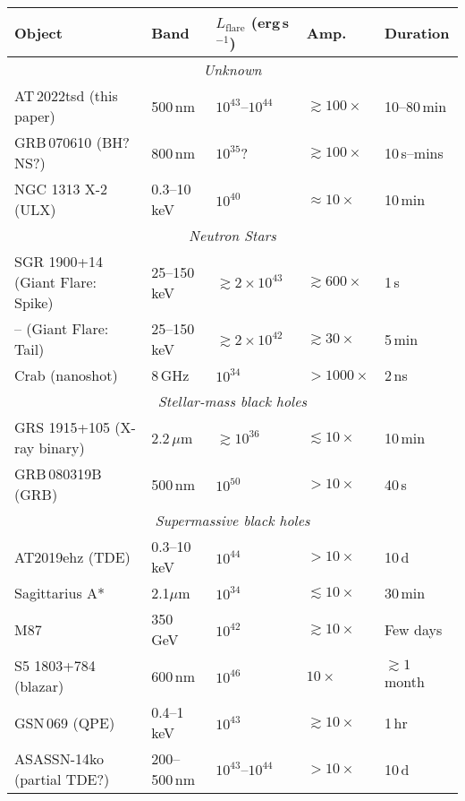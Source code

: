 \documentclass{nature_plusfigure}
\begin{document}
\begin{table}
    \centering
    \begin{tabular}{lllll}
    \hline\hline
     Object & Band & $L_\mathrm{flare}$ (erg\,s$^{-1}$) & Amp. & Duration \\
     \hline
     \multicolumn{5}{c}{\emph{Unknown}}\\
    AT\,2022tsd (this paper) & 500\,nm & $10^{43}$--$10^{44}$ & $\gtrsim100\times$ & 10--80\,min \\
    GRB\,070610 (BH?\cite{Kasliwal2008} NS?\cite{CastroTirado2008,Stefanescu2008}) & 800\,nm & $10^{35}$? & $\gtrsim100\times$ & 10\,s--mins \\
     NGC 1313 X-2 (ULX) & 0.3--10\,keV\cite{Mucciarelli2007} & $10^{40}$ & $\approx10\times$ & 10\,min \\
     \multicolumn{5}{c}{\emph{Neutron Stars}}\\
    SGR 1900+14\cite{Hurley1999} (Giant Flare: Spike) & 25--150\,keV & $\gtrsim2\times10^{43}$ & $\gtrsim600\times$ & 1\,s \\
    -- (Giant Flare: Tail) & 25--150\,keV & $\gtrsim2\times10^{42}$ & $\gtrsim30\times$ & 5\,min \\
    Crab (nanoshot) & 8\,GHz\cite{Hankins2003} & $10^{34}$ & $>1000\times$ & 2\,ns \\
     \multicolumn{5}{c}{\emph{Stellar-mass black holes}}\\
    GRS 1915+105 (X-ray binary) & 2.2\,$\mu$m\cite{Fender1997} & $\gtrsim10^{36}$ & $\lesssim 10\times$ & 10\,min \\
    GRB\,080319B  (GRB) & 500\,nm\cite{Racusin2008} & $10^{50}$ & $>10\times$ & 40\,s \\
     \multicolumn{5}{c}{\emph{Supermassive black holes}}\\
    AT2019ehz (TDE) & 0.3--10\,keV\cite{vanVelzen2021} & $10^{44}$ & $>10\times$ & 10\,d \\  
    Sagittarius A* & 2.1$\mu$m\cite{Marrone2008} & $10^{34}$ & $\lesssim 10\times$ & 30\,min \\
    M87 & 350\,GeV\cite{Abramowski2012} & $10^{42}$ & $\gtrsim10\times$ & Few days \\
    S5 1803+784 (blazar) & 600\,nm\cite{Nesci2021} & $10^{46}$ & $10\times$ & $\gtrsim1\,$month \\
    GSN\,069 (QPE) & 0.4--1\,keV\cite{Miniutti2023} & $10^{43}$ & $\gtrsim10\times$ & 1\,hr \\
    ASASSN-14ko (partial TDE?) & 200--500\,nm\cite{Payne2022} & $10^{43}$--$10^{44}$ & $>10\times$ & 10\,d \\

\end{tabular}
\end{table}
\end{document}

